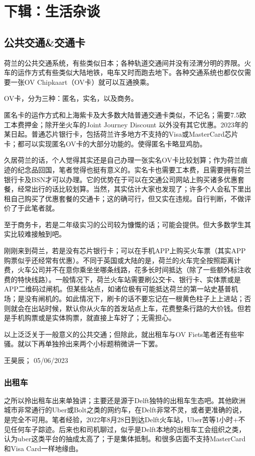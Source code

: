 \section{下辑：生活杂谈}
\subsection{公共交通\&交通卡}
荷兰的公共交通系统，有些类似日本；各种轨道交通间并没有泾渭分明的界限。火车的运作方式有些类似大陆地铁，电车又时而跑去地下。各种交通系统也都仅仅需要一张OV Chipkaart（OV卡）就可以互通换乘。

OV卡，分为三种：匿名，实名，以及商务。

匿名卡的运作方式和上海紫卡及大多数大陆普通交通卡类似，不记名；需要7.5欧工本费押金；除开坐火车的Joint Journey Discount 以外没有其它优惠。2023年的某日起。普通芯片银行卡，包括荷兰许多地方不支持的Visa或MasterCard芯片卡；都可以实现匿名OV卡的大部分功能的。使得匿名卡略显鸡肋。

久居荷兰的话，个人觉得其实还是自己办理一张实名OV卡比较划算；作为荷兰痕迹的纪念品回国，笔者觉得也挺有意义的。实名卡也需要工本费，且需要拥有荷兰银行卡及BSN才可以办理。它的优势在于可以在交通公司网站上购买诸多优惠套餐，经常出行的话比较划算。当然，其实估计大家也发现了；许多个人会私下里出租自己购买了优惠套餐的交通卡；这的确可行，但又实在违规。自行判断，不做评价了于此笔者就。

至于商务卡，若是二年级实习的公司较为慷慨的话；可能会提供。但大多数学生其实比较难接触到吧。

刚刚来到荷兰，若是没有芯片银行卡；可以在手机APP上购买火车票（其实APP购票似乎还经常有优惠）。不同于英国或大陆的是，荷兰的火车完全按照距离计费，火车公司并不在意你乘坐坐哪条线路，花多长时间抵达（除了一些额外标注收费的特快线路）。一般情况下，荷兰火车站需要刷公交卡、银行卡、实体票或是APP二维码过闸机。但某些站点，如诸位极有可能抵达荷兰的第一站史基普机场；是没有闸机的。如此情况下，刷卡的话不要忘记在一根黄色柱子上上进站；否则就会在出站时候，默认你从火车的首发站点上车，花费整条行路的大价钱。但若是手机购票或是实体购票，就直接上车好了；无需担心。

以上泛泛关于一般意义的公共交通；但除此，就出租车与OV Fiets笔者还有些牢骚。就以下再单独拎出来两个小标题稍微讲一下罢。
\begin{flushright}
王昊辰； 05/06/2023
\end{flushright}

\subsubsection{出租车}
之所以拎出租车出来单独讲；主要还是源于Delft独特的出租车生态吧。其他欧洲城市非常通行的Uber或Bolt之类的网约车，在Delft非常不灵，或者更准确的说，是完全不可用。笔者经验，2022年8月28日到达Delft火车站，Uber苦等1小时+不见任何车子踪迹。后来也和司机聊过，似乎是Delft本地的出租车工会组织之类，认为uber这类平台的抽成太高了；于是集体抵制。和很多店面不支持MasterCard和Visa Card一样地缘由。

